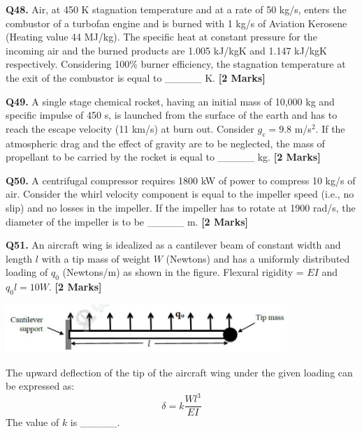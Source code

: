 \documentclass[11pt]{article}
\newcommand{\questionb}[2]{
    \noindent\textbf{Q#2.} #1 \hfill \textbf{[2 Marks]}
}
\begin{document}
\vspace{0.5cm}

\questionb{Air, at 450 K stagnation temperature and at a rate of 50 kg/s, enters the combustor of a turbofan engine and is burned with 1 kg/s of Aviation Kerosene (Heating value 44 MJ/kg). The specific heat at constant pressure for the incoming air and the burned products are 1.005 kJ/kgK and 1.147 kJ/kgK respectively. Considering 100\% burner efficiency, the stagnation temperature at the exit of the combustor is equal to \_\_\_\_\_ K.}{48}

\vspace{0.5cm}

\questionb{A single stage chemical rocket, having an initial mass of 10,000 kg and specific impulse of 450 s, is launched from the surface of the earth and has to reach the escape velocity (11 km/s) at burn out. Consider $g_e = 9.8$ m/s$^2$. If the atmospheric drag and the effect of gravity are to be neglected, the mass of propellant to be carried by the rocket is equal to \_\_\_\_\_ kg.}{49}

\vspace{0.5cm}

\questionb{A centrifugal compressor requires 1800 kW of power to compress 10 kg/s of air. Consider the whirl velocity component is equal to the impeller speed (i.e., no slip) and no losses in the impeller. If the impeller has to rotate at 1900 rad/s, the diameter of the impeller is to be \_\_\_\_\_ m.}{50}

\vspace{0.5cm}

\questionb{An aircraft wing is idealized as a cantilever beam of constant width and length $l$ with a tip mass of weight $W$ (Newtons) and has a uniformly distributed loading of $q_0$ (Newtons/m) as shown in the figure. Flexural rigidity = $EI$ and $q_0 l = 10 W$.}{51}
\begin{center}
\includegraphics[width=0.8\textwidth]{figures/51.png}
\end{center}
The upward deflection of the tip of the aircraft wing under the given loading can be expressed as:
\[
\delta = k \frac{W l^3}{EI}
\]
The value of $k$ is \_\_\_\_\_.

\vspace{0.5cm}
\end{document}
